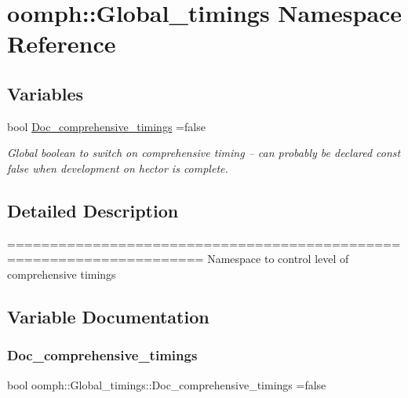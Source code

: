 \hypertarget{namespaceoomph_1_1Global__timings}{}\section{oomph\+:\+:Global\+\_\+timings Namespace Reference}
\label{namespaceoomph_1_1Global__timings}
\subsection*{Variables}
\begin{DoxyCompactItemize}
\item 
bool \hyperlink{namespaceoomph_1_1Global__timings_af25dd181537f6e338daadd0a73d269a0}{Doc\+\_\+comprehensive\+\_\+timings} =false
\begin{DoxyCompactList}\small\item\em Global boolean to switch on comprehensive timing -- can probably be declared const false when development on hector is complete. \end{DoxyCompactList}\end{DoxyCompactItemize}


\subsection{Detailed Description}
===================================================================== Namespace to control level of comprehensive timings 

\subsection{Variable Documentation}
\mbox{\label{namespaceoomph_1_1Global__timings_af25dd181537f6e338daadd0a73d269a0}} 
\subsubsection{\texorpdfstring{Doc\+\_\+comprehensive\+\_\+timings}{Doc\_comprehensive\_timings}}
{\footnotesize\ttfamily bool oomph\+::\+Global\+\_\+timings\+::\+Doc\+\_\+comprehensive\+\_\+timings =false}



